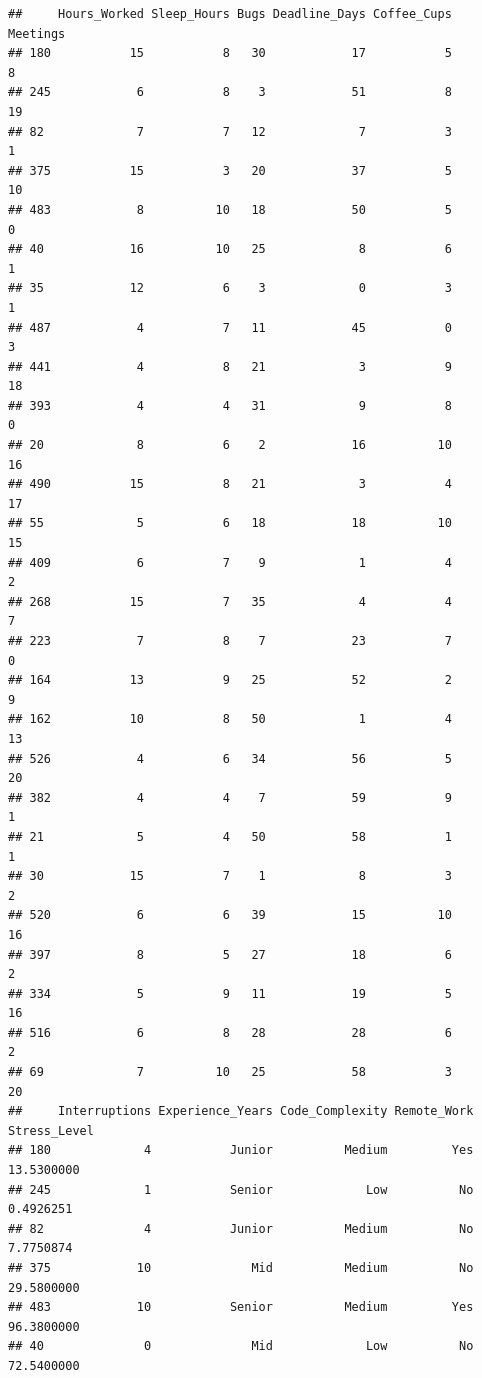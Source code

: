 \documentclass[
]{article}
\begin{document}
\begin{verbatim}
##     Hours_Worked Sleep_Hours Bugs Deadline_Days Coffee_Cups Meetings
## 180           15           8   30            17           5        8
## 245            6           8    3            51           8       19
## 82             7           7   12             7           3        1
## 375           15           3   20            37           5       10
## 483            8          10   18            50           5        0
## 40            16          10   25             8           6        1
## 35            12           6    3             0           3        1
## 487            4           7   11            45           0        3
## 441            4           8   21             3           9       18
## 393            4           4   31             9           8        0
## 20             8           6    2            16          10       16
## 490           15           8   21             3           4       17
## 55             5           6   18            18          10       15
## 409            6           7    9             1           4        2
## 268           15           7   35             4           4        7
## 223            7           8    7            23           7        0
## 164           13           9   25            52           2        9
## 162           10           8   50             1           4       13
## 526            4           6   34            56           5       20
## 382            4           4    7            59           9        1
## 21             5           4   50            58           1        1
## 30            15           7    1             8           3        2
## 520            6           6   39            15          10       16
## 397            8           5   27            18           6        2
## 334            5           9   11            19           5       16
## 516            6           8   28            28           6        2
## 69             7          10   25            58           3       20
##     Interruptions Experience_Years Code_Complexity Remote_Work Stress_Level
## 180             4           Junior          Medium         Yes   13.5300000
## 245             1           Senior             Low          No    0.4926251
## 82              4           Junior          Medium          No    7.7750874
## 375            10              Mid          Medium          No   29.5800000
## 483            10           Senior          Medium         Yes   96.3800000
## 40              0              Mid             Low          No   72.5400000

\end{verbatim}
\end{document}
